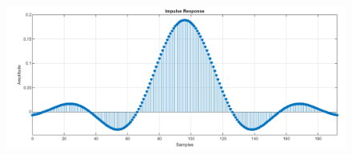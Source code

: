 


\vspace{3mm}

    \begin{figure}[h]
    	\centering
    	\includegraphics[width=1\textwidth]{img/matlab/rrc.PNG}
    	\caption{}
    	\label{fig:rrc}
    \end{figure}
    
\vspace{3mm}